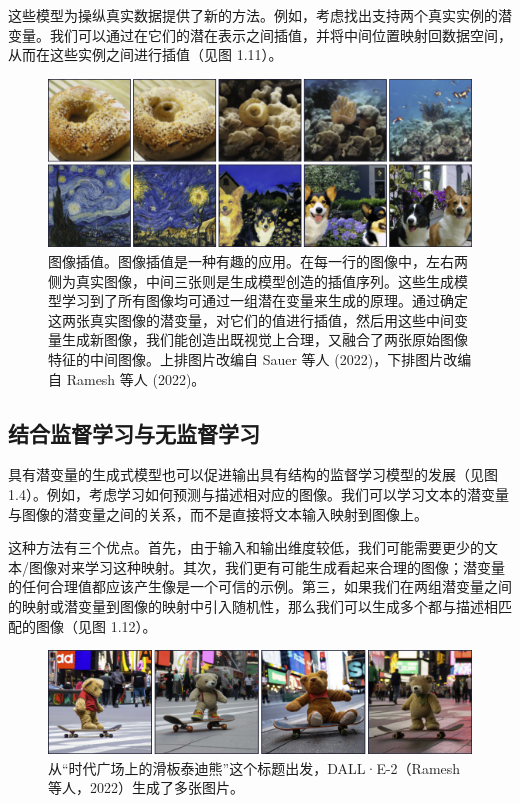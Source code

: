 这些模型为操纵真实数据提供了新的方法。例如，考虑找出支持两个真实实例的潜变量。我们可以通过在它们的潜在表示之间插值，并将中间位置映射回数据空间，从而在这些实例之间进行插值（见图 1.11）。

\begin{figure}
	\centering
	\includegraphics[width=0.7\linewidth]{png/chapter1/IntroInterpolate}
	\caption{图像插值。图像插值是一种有趣的应用。在每一行的图像中，左右两侧为真实图像，中间三张则是生成模型创造的插值序列。这些生成模型学习到了所有图像均可通过一组潜在变量来生成的原理。通过确定这两张真实图像的潜变量，对它们的值进行插值，然后用这些中间变量生成新图像，我们能创造出既视觉上合理，又融合了两张原始图像特征的中间图像。上排图片改编自 Sauer 等人 (2022)，下排图片改编自 Ramesh 等人 (2022)。}
\end{figure}


\subsection{结合监督学习与无监督学习}
具有潜变量的生成式模型也可以促进输出具有结构的监督学习模型的发展（见图 1.4）。例如，考虑学习如何预测与描述相对应的图像。我们可以学习文本的潜变量与图像的潜变量之间的关系，而不是直接将文本输入映射到图像上。

这种方法有三个优点。首先，由于输入和输出维度较低，我们可能需要更少的文本/图像对来学习这种映射。其次，我们更有可能生成看起来合理的图像；潜变量的任何合理值都应该产生像是一个可信的示例。第三，如果我们在两组潜变量之间的映射或潜变量到图像的映射中引入随机性，那么我们可以生成多个都与描述相匹配的图像（见图 1.12）。

\begin{figure}
	\centering
	\includegraphics[width=0.7\linewidth]{png/chapter1/IntroVariety}
	\caption{从“时代广场上的滑板泰迪熊”这个标题出发，DALL·E-2（Ramesh 等人，2022）生成了多张图片。}
\end{figure}


